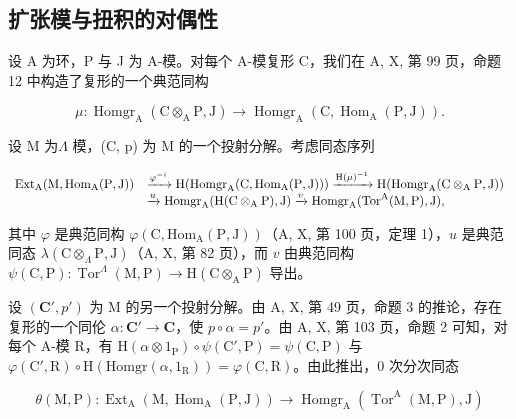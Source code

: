 \subsection{扩张模与扭积的对偶性}

设 A 为环，P 与 J 为 A-模。对每个 A-模复形 C，我们在 A, X, 第 99 页，命题 12 中构造了复形的一个典范同构

\[
\mu : \operatorname{Homgr} _ {\mathrm{A}} (\mathrm{C} \otimes_ {\mathrm{A}} \mathrm{P}, \mathrm{J}) \longrightarrow \operatorname{Homgr} _ {\mathrm{A}} (\mathrm{C}, \operatorname{Hom} _ {\mathrm{A}} (\mathrm{P}, \mathrm{J})) .
\]

设 M 为\(\Lambda\) 模，(C, p) 为 M 的一个投射分解。考虑同态序列

\[
\begin{array}{r l} \operatorname{Ext} _ {\mathrm{A}} (\mathrm{M}, \operatorname{Hom} _ {\mathrm{A}} (\mathrm{P}, \mathrm{J})) & \xrightarrow {\varphi^ {- i}} \mathrm{H} (\operatorname{Homgr} _ {\mathrm{A}} (\mathrm{C}, \operatorname{Hom} _ {\mathrm{A}} (\mathrm{P}, \mathrm{J}))) \xrightarrow {\mathrm{H} (\mu) ^ {- 1}} \mathrm{H} (\operatorname{Homgr} _ {\mathrm{A}} (\mathrm{C} \otimes_ {\mathrm{A}} \mathrm{P}, \mathrm{J})) \\ & \xrightarrow {u} \operatorname{Homgr} _ {\mathrm{A}} (\mathrm{H} (\mathrm{C} \otimes_ {\mathrm{A}} \mathrm{P}), \mathrm{J}) \xrightarrow {v} \operatorname{Homgr} _ {\mathrm{A}} (\operatorname{Tor} ^ {\mathrm{A}} (\mathrm{M}, \mathrm{P}), \mathrm{J}), \end{array}
\]

其中 \(\varphi\) 是典范同构 \(\varphi(\mathrm{C},\mathrm{Hom}_{\mathrm{A}}(\mathrm{P},\mathrm{J}))\)（A, X, 第 100 页，定理 1），\(u\) 是典范同态 \(\lambda(\mathrm{C}\otimes_{\Lambda}\mathrm{P},\mathrm{J})\)（A, X, 第 82 页），而 \(v\) 由典范同构 \(\psi(\mathrm{C},\mathrm{P}):\operatorname{Tor}^{\Lambda}(\mathrm{M},\mathrm{P})\longrightarrow\mathrm{H}(\mathrm{C}\otimes_{\mathrm{A}}\mathrm{P})\) 导出。

设 \((\mathbf{C}', p')\) 为 M 的另一个投射分解。由 A, X, 第 49 页，命题 3 的推论，存在复形的一个同伦 \(\alpha: \mathbf{C}' \to \mathbf{C}\)，使 \(p \circ \alpha = p'\)。由 A, X, 第 103 页，命题 2 可知，对每个 A-模 R，有 \(\mathrm{H}(\alpha \otimes 1_{\mathrm{P}}) \circ \psi(\mathrm{C}', \mathrm{P}) = \psi(\mathrm{C}, \mathrm{P})\) 与 \(\varphi(\mathrm{C}', \mathrm{R}) \circ \mathrm{H}(\mathrm{Homgr}(\alpha, 1_{\mathrm{R}})) = \varphi(\mathrm{C}, \mathrm{R})\)。由此推出，0 次分次同态

\[
\theta (\mathrm{M}, \mathrm{P}): \operatorname{Ext} _ {\mathrm{A}} (\mathrm{M}, \operatorname{Hom} _ {\mathrm{A}} (\mathrm{P}, \mathrm{J})) \longrightarrow \operatorname{Homgr} _ {\mathrm{A}} \left(\operatorname{Tor} ^ {\mathrm{A}} (\mathrm{M}, \mathrm{P}), \mathrm{J}\right)
\]

